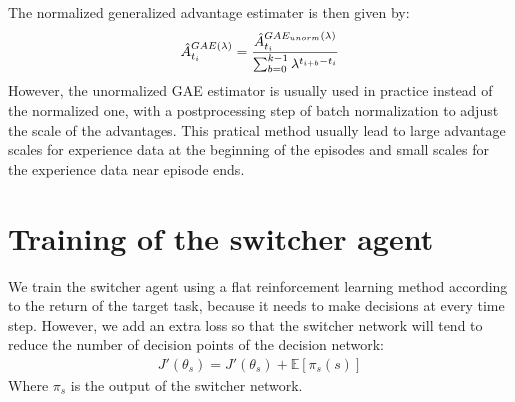 The normalized generalized advantage estimater is then given by:
\begin{align}
\hat{A}_{t_i}^{GAE(\lambda)}
= \frac{\hat{A}_{t_i}^{GAE_{unorm}(\lambda)}}{\sum_{b=0}^{k-1} \lambda^{t_{i+b}-t_i}}
\end{align}
However, the unormalized GAE estimator is usually used in practice instead of the normalized one, with a postprocessing step of batch normalization to adjust the scale of the advantages. This pratical method usually lead to large advantage scales for experience data at the beginning of the episodes and small scales for the experience data near episode ends.

\section{Training of the switcher agent}
We train the switcher agent using a flat reinforcement learning method according to the return of the target task, because it needs to make decisions at every time step. However, we add an extra loss so that the switcher network will tend to reduce the number of decision points of the decision network:
\begin{align}
J'(\theta_s) = J'(\theta_s) + \mathbb{E}[\pi_s(s)]
\end{align}
Where $\pi_s$ is the output of the switcher network.

